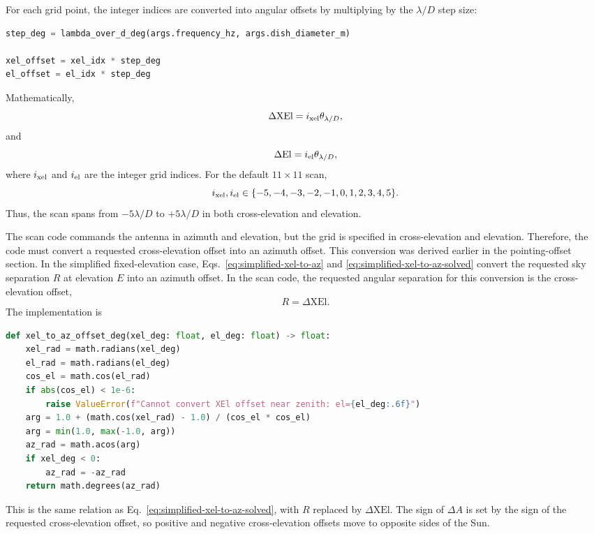 \documentclass[12pt]{extarticle}
\begin{document}
For each grid point, the integer indices are converted into angular offsets by multiplying by the $\lambda/D$ step size:
\begin{lstlisting}[language=Python]
step_deg = lambda_over_d_deg(args.frequency_hz, args.dish_diameter_m)

xel_offset = xel_idx * step_deg
el_offset = el_idx * step_deg
\end{lstlisting}
Mathematically,
\begin{equation}
    \Delta \mathrm{XEl}=i_{\rm xel}\theta_{\lambda/D},
\end{equation}
and
\begin{equation}
    \Delta \mathrm{El}=i_{\rm el}\theta_{\lambda/D},
\end{equation}
where $i_{\rm xel}$ and $i_{\rm el}$ are the integer grid indices. For the default $11\times 11$ scan,
\begin{equation}
    i_{\rm xel},i_{\rm el}\in\{-5,-4,-3,-2,-1,0,1,2,3,4,5\}.
\end{equation}
Thus, the scan spans from $-5\lambda/D$ to $+5\lambda/D$ in both cross-elevation and elevation.

The scan code commands the antenna in azimuth and elevation, but the grid is specified in cross-elevation and elevation. Therefore, the code must convert a requested cross-elevation offset into an azimuth offset. This conversion was derived earlier in the pointing-offset section. In the simplified fixed-elevation case, Eqs.~\eqref{eq:simplified-xel-to-az} and \eqref{eq:simplified-xel-to-az-solved} convert the requested sky separation $R$ at elevation $E$ into an azimuth offset.
In the scan code, the requested angular separation for this conversion is the cross-elevation offset,
\begin{equation}
    R=\Delta \mathrm{XEl}.
\end{equation}
The implementation is
\begin{lstlisting}[language=Python]
def xel_to_az_offset_deg(xel_deg: float, el_deg: float) -> float:
    xel_rad = math.radians(xel_deg)
    el_rad = math.radians(el_deg)
    cos_el = math.cos(el_rad)
    if abs(cos_el) < 1e-6:
        raise ValueError(f"Cannot convert XEl offset near zenith: el={el_deg:.6f}")
    arg = 1.0 + (math.cos(xel_rad) - 1.0) / (cos_el * cos_el)
    arg = min(1.0, max(-1.0, arg))
    az_rad = math.acos(arg)
    if xel_deg < 0:
        az_rad = -az_rad
    return math.degrees(az_rad)
\end{lstlisting}
This is the same relation as Eq.~\eqref{eq:simplified-xel-to-az-solved}, with $R$ replaced by $\Delta\mathrm{XEl}$. The sign of $\Delta A$ is set by the sign of the requested cross-elevation offset, so positive and negative cross-elevation offsets move to opposite sides of the Sun.
\end{document}
